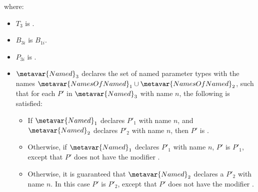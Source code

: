 \documentclass[makeidx]{article}
\begin{document}
\begin{itemize}
  \noindent
  where:

  \begin{itemize}
  \item $T_3$ is .
  \item $B_{3i}$ is $B_{1i}$.
  \item $P_{3i}$ is .
  \item $\metavar{Named}_3$ declares the set
    of named parameter types with the names
    $\metavar{NamesOfNamed}_1\cup\metavar{NamesOfNamed}_2$,
    such that for each $P'$ in $\metavar{Named}_3$ with name $n$,
    the following is satisfied:
    \begin{itemize}
    \item If $\metavar{Named}_1$ declares $P'_1$ with name $n$,
      and $\metavar{Named}_2$ declares $P'_2$ with name $n$,
      then $P'$ is .
    \item Otherwise, if $\metavar{Named}_1$ declares $P'_1$ with name $n$,
      $P'$ is $P'_1$,
      except that $P'$ does not have the modifier \REQUIRED.
    \item Otherwise, it is guaranteed that
      $\metavar{Named}_2$ declares a $P'_2$ with name $n$.
      In this case $P'$ is $P'_2$,
      except that $P'$ does not have the modifier \REQUIRED.
    \end{itemize}
  \end{itemize}


\end{itemize}
\end{document}
